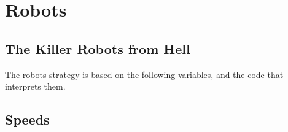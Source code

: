 \section{Robots}
\subsection{The Killer Robots from Hell}

The robots strategy is based on the following variables, and the code that
interprets them.

\subsection{Speeds}
\begin{description}
\end{description}
